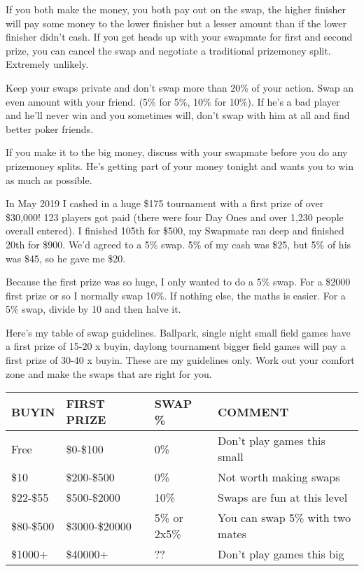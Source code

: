 If you both make the money, you both pay out on the swap, the
higher finisher will pay some money to the lower finisher but a lesser
amount than if the lower finisher didn't cash. If you get heads up
with your swapmate for first and second prize, you can cancel the swap
and negotiate a traditional prizemoney split. Extremely unlikely.

Keep your swaps private and don't swap more than 20\% of your action.
Swap an even amount with your friend. (5\% for 5\%, 10\% for 10\%).
If he's a bad player and he'll never win and you sometimes will, don't
swap with him at all and find better poker friends.

If you make it to the big money, discuss with your swapmate before you
do any prizemoney splits. He's getting part of your money tonight and
wants you to win as much as possible.

In May 2019 I cashed in a huge \$175 tournament with a first
prize of over \$30,000! 123 players got paid (there were four Day Ones
and over 1,230 people overall entered). I finished 105th for \$500, my
Swapmate ran deep and finished 20th for \$900. We'd agreed to a 5\% swap.
5\% of my cash was \$25, but 5\% of his was \$45, so he gave me \$20.

Because the first prize was so huge, I only wanted to do a 5\% swap.
For a \$2000 first prize or so I normally swap 10\%. If nothing else,
the maths is easier. For a 5\% swap, divide by 10 and then halve it.

Here's my table of swap guidelines. Ballpark, single night small field
games have a first prize of 15-20 x buyin, daylong tournament bigger
field games will pay a first prize of 30-40 x buyin.
These are my guidelines only. Work out your comfort zone and make the
swaps that are right for you.

\begin{tabular}{|l|l|l|l|} \hline
BUYIN      & FIRST PRIZE    & SWAP \% & COMMENT\\ \hline
Free       & \$0-\$100      & 0\%     & Don't play games this small \\ \hline
\$10       & \$200-\$500    & 0\%     & Not worth making swaps \\ \hline
\$22-\$55  & \$500-\$2000   & 10\%    & Swaps are fun at this level \\ \hline
\$80-\$500 & \$3000-\$20000 & 5\% or 2x5\% & You can swap 5\% with two mates \\ \hline
\$1000+    & \$40000+ & ?? & Don't play games this big \\ \hline
\end{tabular}

